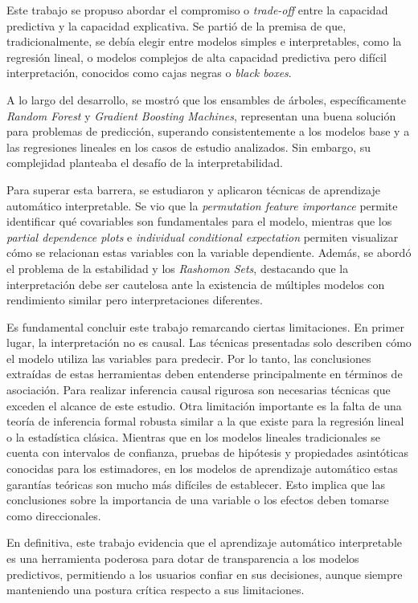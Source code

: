 Este trabajo se propuso abordar el compromiso o \textit{trade-off} entre la capacidad predictiva y la capacidad explicativa. Se partió de la premisa de que, tradicionalmente, se debía elegir entre modelos simples e interpretables, como la regresión lineal, o modelos complejos de alta capacidad predictiva pero difícil interpretación, conocidos como cajas negras o \textit{black boxes}.

A lo largo del desarrollo, se mostró que los ensambles de árboles, específicamente \textit{Random Forest} y \textit{Gradient Boosting Machines}, representan una buena solución para problemas de predicción, superando consistentemente a los modelos base y a las regresiones lineales en los casos de estudio analizados. Sin embargo, su complejidad planteaba el desafío de la interpretabilidad.

Para superar esta barrera, se estudiaron y aplicaron técnicas de aprendizaje automático interpretable. Se vio que la \textit{permutation feature importance} permite identificar qué covariables son fundamentales para el modelo, mientras que los \textit{partial dependence plots} e \textit{individual conditional expectation} permiten visualizar cómo se relacionan estas variables con la variable dependiente. Además, se abordó el problema de la estabilidad y los \textit{Rashomon Sets}, destacando que la interpretación debe ser cautelosa ante la existencia de múltiples modelos con rendimiento similar pero interpretaciones diferentes.

Es fundamental concluir este trabajo remarcando ciertas limitaciones. En primer lugar, la interpretación no es causal. Las técnicas presentadas solo describen cómo el modelo utiliza las variables para predecir. Por lo tanto, las conclusiones extraídas de estas herramientas deben entenderse principalmente en términos de asociación. Para realizar inferencia causal rigurosa son necesarias técnicas que exceden el alcance de este estudio. Otra limitación importante es la falta de una teoría de inferencia formal robusta similar a la que existe para la regresión lineal o la estadística clásica. Mientras que en los modelos lineales tradicionales se cuenta con intervalos de confianza, pruebas de hipótesis y propiedades asintóticas conocidas para los estimadores, en los modelos de aprendizaje automático estas garantías teóricas son mucho más difíciles de establecer. Esto implica que las conclusiones sobre la importancia de una variable o los efectos deben tomarse como direccionales.

En definitiva, este trabajo evidencia que el aprendizaje automático interpretable es una herramienta poderosa para dotar de transparencia a los modelos predictivos, permitiendo a los usuarios confiar en sus decisiones, aunque siempre manteniendo una postura crítica respecto a sus limitaciones.